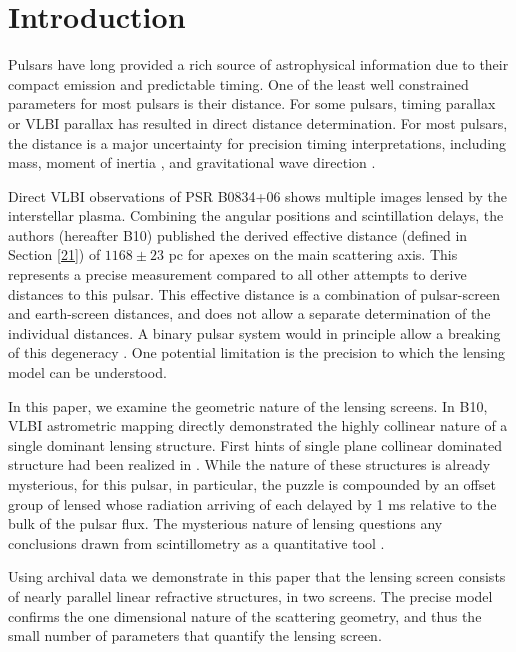 \documentclass[useAMS,usenatbib]{mn2e}
\begin{document}
\section{Introduction}

Pulsars have long provided a rich source of astrophysical information
due to their compact emission and predictable timing. One of the
least well constrained parameters for most pulsars is their 
distance.  For some pulsars, timing parallax or VLBI parallax has
resulted in direct distance determination.  For most pulsars, the
distance is a major uncertainty for precision timing interpretations,
including mass, moment of inertia \citep{2006Sci...314...97K,2012hpa..book.....L}, and
gravitational wave direction \citep{boyle2012}.

Direct VLBI observations of PSR B0834+06 shows multiple images lensed
by the interstellar plasma.  Combining the angular positions and
scintillation delays, the authors \citep{2010ApJ...708..232B} (hereafter B10) published the derived effective
distance (defined in Section \ref{21}) of $1168\pm 23$ pc
for apexes on the main scattering axis.
This represents a precise
measurement compared to all other attempts to derive distances to this
pulsar.  This effective distance is a combination of pulsar-screen and
earth-screen distances, and does not allow a separate determination of
the individual distances.  A binary pulsar system would in principle
allow a breaking of this degeneracy \citep{2014MNRAS.442.3338P}. One
potential limitation is the precision to which the lensing model can
be understood.  

In this paper, we examine the geometric nature of the lensing screens.
In B10, VLBI astrometric mapping directly demonstrated the highly
collinear nature of a single dominant lensing structure.  First hints
of single plane collinear dominated structure had been realized in
\citet{2001ApJ...549L..97S}.   While the nature of these structures
is already mysterious, for this pulsar, in particular, the puzzle is compounded by an offset group
of lensed whose radiation arriving of each delayed by 1 ms relative to the bulk of the pulsar flux.  The mysterious nature of
lensing questions any conclusions drawn from scintillometry as a
quantitative tool \citep{2014MNRAS.440L..36P}.


Using archival data we demonstrate in this paper that the lensing screen
consists of nearly parallel linear refractive structures, in two
screens.  The precise model confirms the one dimensional nature of the scattering geometry, and
thus the small number of parameters that
quantify the lensing screen. 
\end{document}
